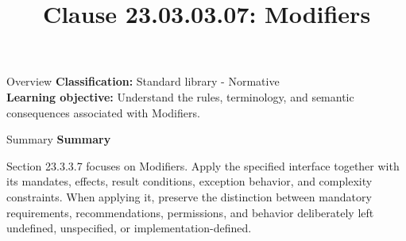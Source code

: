 \documentclass[10pt,letterpaper]{article}
\title{Clause 23.03.03.07: Modifiers}
\author{}
\date{}
\begin{document}
\maketitle
\begin{CornellOverviewBox}{Overview}
\textbf{Classification:} Standard library - Normative\\[2pt]
\textbf{Learning objective:} Understand the rules, terminology, and semantic consequences associated with Modifiers.
\end{CornellOverviewBox}\begin{CornellSummaryBox}{Summary}
{\sffamily\bfseries\color{Accent} Summary}\par\vspace{3pt}Section 23.3.3.7 focuses on Modifiers. Apply the specified interface together with its mandates, effects, result conditions, exception behavior, and complexity constraints. When applying it, preserve the distinction between mandatory requirements, recommendations, permissions, and behavior deliberately left undefined, unspecified, or implementation-defined.
\end{CornellSummaryBox}
\end{document}
